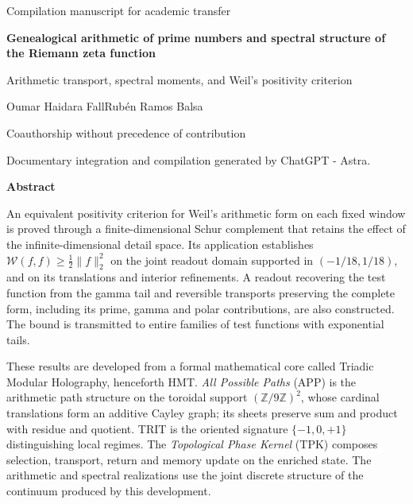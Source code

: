 \thispagestyle{empty}
\begin{center}
{\fontsize{10}{12}\selectfont Compilation manuscript for academic transfer\par}
\vspace{6mm}
{\fontsize{17}{20.5}\selectfont\bfseries Genealogical arithmetic of prime numbers and spectral structure of the Riemann zeta function\par}
\vspace{7pt}
{\fontsize{12}{14.5}\selectfont Arithmetic transport, spectral moments, and Weil's positivity criterion\par}
\vspace{8pt}
{\fontsize{11.5}{14}\selectfont Oumar Haidara Fall\space\textperiodcentered\space Rubén Ramos Balsa\par}
\vspace{4pt}
{\fontsize{8}{10}\selectfont Coauthorship without precedence of contribution\par}
\vspace{4pt}
{\fontsize{8}{10}\selectfont Documentary integration and compilation generated by ChatGPT - Astra.\par}
\end{center}
\vspace{3pt}
{}
\begin{center}\bfseries Abstract\end{center}
\begingroup\fontsize{10.5}{12.8}\selectfont
An equivalent positivity criterion for Weil's arithmetic form on each
fixed window is proved through a finite-dimensional Schur complement
that retains the effect of the infinite-dimensional detail space.
Its application establishes
$\mathscr W(f,f)\geq\frac12\|f\|_2^2$ on the joint readout
domain supported in $(-1/18,1/18)$, and on its translations and
interior refinements. A readout recovering the test function from
the gamma tail and reversible transports preserving the complete
form, including its prime, gamma and polar contributions, are also
constructed. The bound is transmitted to entire families of test
functions with exponential tails.

These results are developed from a formal mathematical core
called Triadic Modular Holography, henceforth HMT.
\emph{All Possible Paths} (APP) is the arithmetic path structure
on the toroidal support $(\mathbb Z/9\mathbb Z)^2$, whose
cardinal translations form an additive Cayley graph; its sheets
preserve sum and product with residue and quotient. TRIT is the
oriented signature $\{-1,0,+1\}$ distinguishing local regimes.
The \emph{Topological Phase Kernel} (TPK) composes selection,
transport, return and memory update on the enriched state.
The arithmetic and spectral realizations use the joint discrete
structure of the continuum produced by this development.

